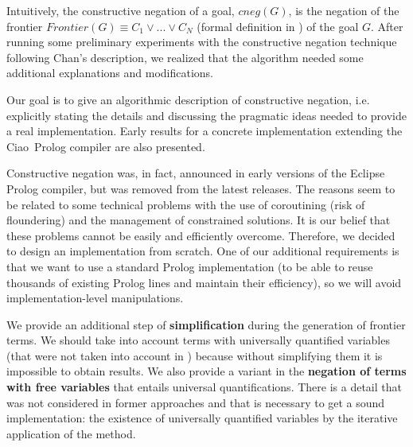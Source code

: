 \documentclass{llncs}
\newcommand{\ciao}{Ciao}
\begin{document}
Intuitively, the constructive negation of a goal, $cneg(G)$, is the
negation of the frontier $Frontier(G) \equiv C_1 \vee ... \vee C_N$
(formal definition in \cite{Stuckey95}) of the goal $G$. After running
some preliminary experiments with the constructive negation technique
following Chan's description, we realized that the algorithm needed
some additional explanations and modifications.


Our goal is to give an algorithmic description of constructive
negation, i.e. explicitly stating the details and discussing the
pragmatic ideas needed to provide a real implementation. Early results
for a concrete implementation extending the \ciao\ Prolog compiler are
also presented.



Constructive negation was, in fact, announced in early versions of the
  Eclipse Prolog compiler, but was removed from the latest releases.
  The reasons seem to be related to some technical problems with the
  use of coroutining (risk of floundering) and the management of
  constrained solutions. It is our belief
  that these problems cannot be easily and efficiently
  overcome. Therefore, we decided to design an implementation from
  scratch.  One of our additional requirements is that we want to use
  a standard Prolog implementation (to be able to reuse thousands of
  existing Prolog lines and maintain their efficiency), so we will
  avoid implementation-level manipulations.


We provide an additional step of {\bf simplification} during the
generation of frontier terms. We should take into account terms with
universally quantified variables (that were not taken into account in
\cite{Chan1,Chan2}) because without simplifying them it is impossible
to obtain results. We also provide a variant in the {\bf negation of
terms with free variables} that entails universal
quantifications. There is a detail that was not considered in former
approaches and that is necessary to get a sound implementation: the
existence of universally quantified variables by the iterative
application of the method.
\end{document}
